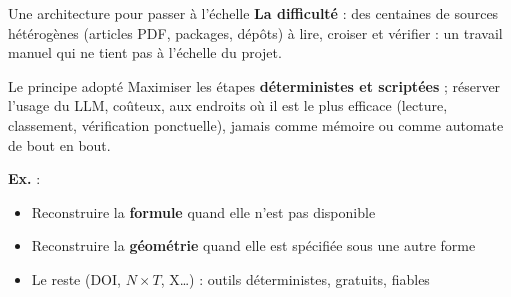 \documentclass[aspectratio=169,11pt]{beamer}
\begin{document}
\begin{frame}{Une architecture pour passer à l'échelle}
\small
\textbf{La difficulté} : des centaines de sources hétérogènes (articles PDF,
packages, dépôts) à lire, croiser et vérifier : un travail manuel qui ne
tient pas à l'échelle du projet.
\vspace{0.3cm}
\begin{block}{Le principe adopté}
Maximiser les étapes \textbf{déterministes et scriptées} ; réserver l'usage
du LLM, coûteux, aux endroits où il est le plus efficace (lecture,
classement, vérification ponctuelle), jamais comme mémoire ou comme automate
de bout en bout.
\end{block}
\vspace{0.25cm}
\textbf{Ex.} :
\begin{itemize}\setlength\itemsep{0.08cm}
    \item Reconstruire la \textbf{formule} quand elle n'est pas disponible
    \item Reconstruire la \textbf{géométrie} quand elle est spécifiée sous une autre forme
    \item Le reste (DOI, $N\times T$, X\dots) : outils déterministes, gratuits, fiables
\end{itemize}
\end{frame}
\end{document}
